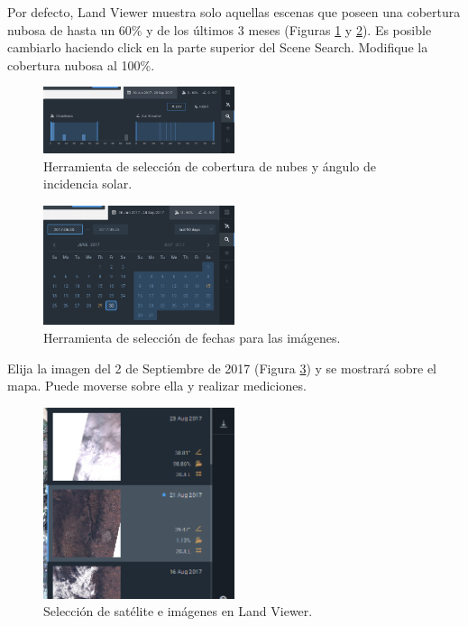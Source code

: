 \documentclass[a4paper,12pt]{book}
\begin{document}
 Por defecto, Land Viewer muestra solo aquellas escenas que poseen una cobertura nubosa de hasta un 60\% y de los últimos 3 meses (Figuras \ref{fig:nube} y \ref{fig:fecha}). Es posible cambiarlo haciendo click en la parte superior del Scene Search.  Modifique la cobertura nubosa al 100\%.

\begin{figure}[h!]
    \centering
    \includegraphics[width=0.5\textwidth]{fig:nube.png}
    \caption{Herramienta de selección de cobertura de nubes y ángulo de incidencia solar.}
    \label{fig:nube}
\end{figure}

\begin{figure}[h!]
    \centering
    \includegraphics[width=0.5\textwidth]{fig:fecha.png}
    \caption{Herramienta de selección de fechas para las imágenes.}
    \label{fig:fecha}
\end{figure}


Elija la imagen del 2 de Septiembre de 2017 (Figura \ref{fig:scene}) y se mostrará sobre el mapa. Puede moverse sobre ella y realizar mediciones.

\begin{figure}[hb!]
\centering
  \includegraphics[width=0.5\textwidth]{fig:imagen1.png}
\caption{Selección de satélite e imágenes en Land Viewer.}
\label{fig:scene}
\end{figure}
\end{document}
